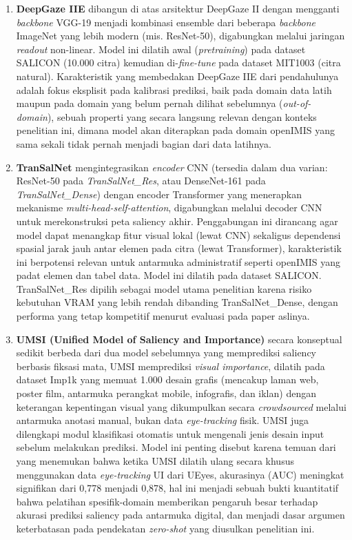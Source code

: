 \begin{enumerate}
    \item \textbf{DeepGaze IIE} \citep{linardos2021deepgaze} dibangun di atas arsitektur DeepGaze II dengan mengganti \textit{backbone} VGG-19 menjadi kombinasi ensemble dari beberapa \textit{backbone} ImageNet yang lebih modern (mis. ResNet-50), digabungkan melalui jaringan \textit{readout} non-linear. Model ini dilatih awal (\textit{pretraining}) pada dataset SALICON (10.000 citra) kemudian di-\textit{fine-tune} pada dataset MIT1003 (citra natural). Karakteristik yang membedakan DeepGaze IIE dari pendahulunya adalah fokus eksplisit pada kalibrasi prediksi, baik pada domain data latih maupun pada domain yang belum pernah dilihat sebelumnya (\textit{out-of-domain}), sebuah properti yang secara langsung relevan dengan konteks penelitian ini, dimana model akan diterapkan pada domain openIMIS yang sama sekali tidak pernah menjadi bagian dari data latihnya.

    \item \textbf{TranSalNet} \citep{lou2022transalnet} mengintegrasikan \textit{encoder} CNN (tersedia dalam dua varian: ResNet-50 pada \textit{TranSalNet\_Res}, atau DenseNet-161 pada \textit{TranSalNet\_Dense}) dengan encoder Transformer yang menerapkan mekanisme \textit{multi-head-self-attention}, digabungkan melalui decoder CNN untuk merekonstruksi peta saliency akhir. Penggabungan ini dirancang agar model dapat menangkap fitur visual lokal (lewat CNN) sekaligus dependensi spasial jarak jauh antar elemen pada citra (lewat Transformer), karakteristik ini berpotensi relevan untuk antarmuka administratif seperti openIMIS yang padat elemen dan tabel data. Model ini dilatih pada dataset SALICON. TranSalNet\_Res dipilih sebagai model utama penelitian karena risiko kebutuhan VRAM yang lebih rendah dibanding TranSalNet\_Dense, dengan performa yang tetap kompetitif menurut evaluasi pada paper aslinya.

    \item \textbf{UMSI (Unified Model of Saliency and Importance)} \citep{fosco2020predicting} secara konseptual sedikit berbeda dari dua model sebelumnya yang memprediksi saliency berbasis fiksasi mata, UMSI memprediksi \textit{visual importance}, dilatih pada dataset Imp1k yang memuat 1.000 desain grafis (mencakup laman web, poster film, antarmuka perangkat mobile, infografis, dan iklan) dengan keterangan kepentingan visual yang dikumpulkan secara \textit{crowdsourced} melalui antarmuka anotasi manual, bukan data \textit{eye-tracking} fisik. UMSI juga dilengkapi modul klasifikasi otomatis untuk mengenali jenis desain input sebelum melakukan prediksi. Model ini penting disebut karena temuan dari \citet{jiang2023ueyes} yang menemukan bahwa ketika UMSI dilatih ulang secara khusus menggunakan data \textit{eye-tracking} UI dari UEyes, akurasinya (AUC) meningkat signifikan dari 0,778 menjadi 0,878, hal ini menjadi sebuah bukti kuantitatif bahwa pelatihan spesifik-domain memberikan pengaruh besar terhadap akurasi prediksi saliency pada antarmuka digital, dan menjadi dasar argumen keterbatasan pada pendekatan \textit{zero-shot} yang diusulkan penelitian ini.
    

\end{enumerate}

